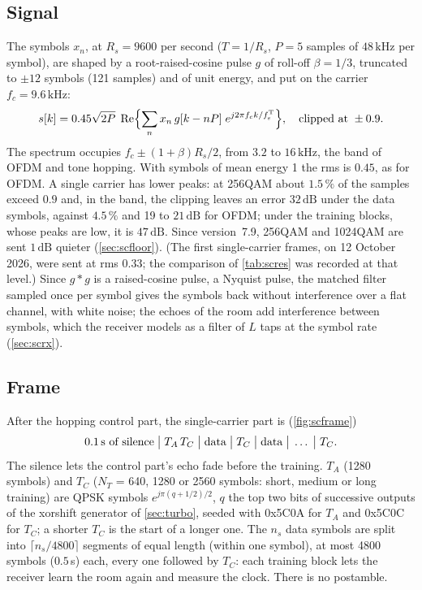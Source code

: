 \documentclass[11pt,a4paper]{article}
\newcommand{\kHz}{\,\mathrm{kHz}}
\newcommand{\dB}{\,\mathrm{dB}}
\newcommand{\fsT}{f_{\mathrm{s}}^{\mathrm{T}}}
\theoremstyle{remark}
\begin{document}
\subsection{Signal}
\label{sec:scsig}
The symbols $x_n$, at $R_s = 9600$ per second ($T = 1/R_s$, $P = 5$ samples of $48\kHz$ per symbol), are shaped by a root-raised-cosine pulse $g$ of roll-off $\beta = 1/3$, truncated to $\pm 12$ symbols (121 samples) and of unit energy, and put on the carrier $f_c = 9.6\kHz$:
\begin{equation}
s[k] = 0.45\sqrt{2P}\;\operatorname{Re}\Bigl\{\sum_n x_n\, g[k - nP]\; e^{j2\pi f_c k/\fsT}\Bigr\}, \quad \text{clipped at } \pm 0.9 .
\label{eq:scsig}
\end{equation}
The spectrum occupies $f_c \pm (1+\beta)R_s/2$, from $3.2$ to $16\kHz$, the band of OFDM and tone hopping. With symbols of mean energy 1 the rms is $0.45$, as for OFDM. A single carrier has lower peaks: at 256QAM about $1.5\,\%$ of the samples exceed $0.9$ and, in the band, the clipping leaves an error $32\dB$ under the data symbols, against $4.5\,\%$ and 19 to $21\dB$ for OFDM; under the training blocks, whose peaks are low, it is $47\dB$. Since version~7.9, 256QAM and 1024QAM are sent $1\dB$ quieter (\cref{sec:scfloor}). (The first single-carrier frames, on 12 October 2026, were sent at rms $0.33$; the comparison of \cref{tab:scres} was recorded at that level.) Since $g * g$ is a raised-cosine pulse, a Nyquist pulse, the matched filter sampled once per symbol gives the symbols back without interference over a flat channel, with white noise; the echoes of the room add interference between symbols, which the receiver models as a filter of $L$ taps at the symbol rate (\cref{sec:scrx}).

\subsection{Frame}
\label{sec:scframe}
After the hopping control part, the single-carrier part is (\cref{fig:scframe})
\[
0.1\text{\,s of silence} \;\big|\; T_A\, T_C \;\big|\; \text{data} \;\big|\; T_C \;\big|\; \text{data} \;\big|\; \dots \;\big|\; T_C .
\]
The silence lets the control part's echo fade before the training. $T_A$ (1280 symbols) and $T_C$ ($N_T$ = 640, 1280 or 2560 symbols: short, medium or long training) are QPSK symbols $e^{j\pi(q + 1/2)/2}$, $q$ the top two bits of successive outputs of the xorshift generator of \cref{sec:turbo}, seeded with 0x5C0A for $T_A$ and 0x5C0C for $T_C$; a shorter $T_C$ is the start of a longer one. The $n_s$ data symbols are split into $\lceil n_s/4800 \rceil$ segments of equal length (within one symbol), at most 4800 symbols ($0.5$\,s) each, every one followed by $T_C$: each training block lets the receiver learn the room again and measure the clock. There is no postamble.
\end{document}

